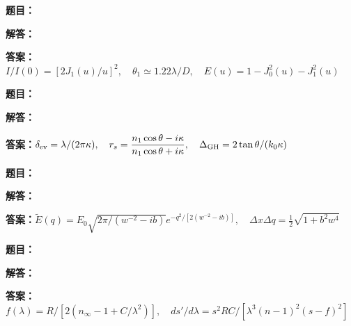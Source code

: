 \documentclass[lang=cn,color=blue,11pt]{elegantbook}
\begin{document}
\noindent\textbf{题目：}
\par\noindent\textbf{解答：}
\par\noindent\textbf{答案：}\(\displaystyle I/I(0)=[2J_1(u)/u]^2,\quad\theta_1\simeq1.22\lambda/D,\quad E(u)=1-J_0^2(u)-J_1^2(u)\)\par
\par\smallskip\noindent\hrulefill\par\medskip
{}\par
\noindent\textbf{题目：}
\par\noindent\textbf{解答：}
\par\noindent\textbf{答案：}\(\displaystyle \delta_{\rm ev}=\lambda/(2\pi\kappa),\quad r_s=\frac{n_1\cos\theta-i\kappa}{n_1\cos\theta+i\kappa},\quad\Delta_{\rm GH}=2\tan\theta/(k_0\kappa)\)\par
\par\smallskip\noindent\hrulefill\par\medskip
{}\par
\noindent\textbf{题目：}
\par\noindent\textbf{解答：}
\par\noindent\textbf{答案：}\(\displaystyle \widetilde E(q)=E_0\sqrt{2\pi/(w^{-2}-ib)}e^{-q^2/[2(w^{-2}-ib)]},\quad\Delta x\Delta q=\tfrac12\sqrt{1+b^2w^4}\)\par
\par\smallskip\noindent\hrulefill\par\medskip
{}\par
\noindent\textbf{题目：}
\par\noindent\textbf{解答：}
\par\noindent\textbf{答案：}\(\displaystyle f(\lambda)=R/[2(n_\infty-1+C/\lambda^2)],\quad ds'/d\lambda=s^2RC/[\lambda^3(n-1)^2(s-f)^2]\)\par
\par\smallskip\noindent\hrulefill\par\medskip
{}\par
\end{document}
